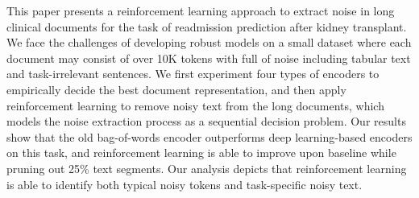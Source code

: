 This paper presents a reinforcement learning approach to extract noise in long clinical documents for the task of readmission prediction after kidney transplant. We face the challenges of developing robust models on a small dataset where each document may consist of over 10K tokens with full of noise including tabular text and task-irrelevant sentences. We first experiment four types of encoders to empirically decide the best document representation, and then apply reinforcement learning to remove noisy text from the long documents, which models the noise extraction process as a sequential decision problem. Our results show that the old bag-of-words encoder outperforms deep learning-based encoders on this task, and reinforcement learning is able to improve upon baseline while pruning out 25\% text segments. Our analysis depicts that reinforcement learning is able to identify both typical noisy tokens and task-specific noisy text.
